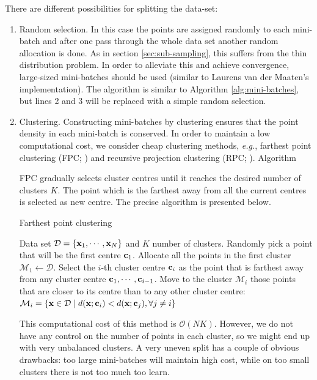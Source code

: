 There are different possibilities for splitting the data-set:
\begin{enumerate}
	\item Random selection. In this case the points are assigned randomly to each mini-batch and after one pass through the whole data set another random allocation is done. As in section \ref{sec:sub-sampling}, this suffers from the thin distribution problem. In order to alleviate this and achieve convergence, large-sized mini-batches should be used (similar to Laurens van der Maaten's implementation). The algorithm is similar to Algorithm \ref{alg:mini-batches}, but lines 2 and 3 will be replaced with a simple random selection.
	
	\item Clustering. Constructing mini-batches by clustering ensures that the point density in each mini-batch is conserved. In order to maintain a low computational cost, we consider cheap clustering methods, \textit{e.g.}, farthest point clustering (FPC; \citealp{gonzalez1985}) and recursive projection clustering (RPC; \citealp{chalupka2011}). Algorithm 
	
	FPC gradually selects cluster centres until it reaches the desired number of clusters $K$. The point which is the farthest away from all the current centres is selected as new centre. The precise algorithm is presented below.
	
	\begin{algorithm} 
		\caption{Farthest point clustering} 
		\label{alg:fpc}  
		\begin{algorithmic}                    %
			\REQUIRE Data set $\mathcal{D}=\{\mathbf{x}_1,\cdots,\mathbf{x}_N\}$ and $K$ number of clusters.
			\STATE Randomly pick a point that will be the first centre $\mathbf{c}_1$.
			\STATE Allocate all the points in the first cluster $\mathcal{M}_1 \leftarrow \mathcal{D}$.
				\STATE Select the $i$-th cluster centre $\mathbf{c}_i$ as the point that is farthest away from any cluster centre $\mathbf{c}_1,\cdots,\mathbf{c}_{i-1}$.
				\STATE Move to the cluster $\mathcal{M}_i$ those points that are closer to its centre than to any other cluster centre: $\mathcal{M}_i = \left\{ \mathbf{x} \in \mathcal{D} \;| \; d(\mathbf{x};\mathbf{c}_i) < d(\mathbf{x};\mathbf{c}_j), \forall j \neq i \right\}$
			\ENDFOR
		\end{algorithmic}
	\end{algorithm}
	
	This computational cost of this method is $\mathcal{O}(NK)$. However, we do not have any control on the number of points in each cluster, so we might end up with very unbalanced clusters. A very uneven split has a couple of obvious drawbacks: too large mini-batches will maintain high cost, while on too small clusters there is not too much too learn.
	

\end{enumerate}
